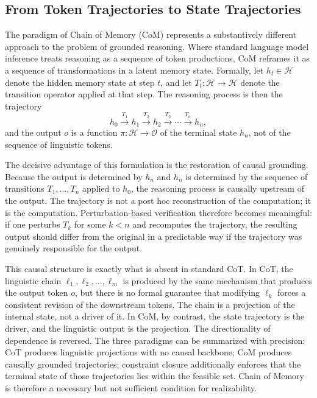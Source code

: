 \documentclass[12pt, oneside]{article}
\begin{document}
\subsection{From Token Trajectories to State Trajectories}

The paradigm of Chain of Memory (CoM) represents a substantively different approach to the problem of grounded reasoning. Where standard language model inference treats reasoning as a sequence of token productions, CoM reframes it as a sequence of transformations in a latent memory state. Formally, let $h_t \in \mathcal{H}$ denote the hidden memory state at step $t$, and let $T_t : \mathcal{H} \to \mathcal{H}$ denote the transition operator applied at that step. The reasoning process is then the trajectory
\begin{equation}
  h_0 \xrightarrow{T_1} h_1 \xrightarrow{T_2} h_2 \xrightarrow{T_3} \cdots \xrightarrow{T_n} h_n,
\end{equation}
and the output $o$ is a function $\pi : \mathcal{H} \to \mathcal{O}$ of the terminal state $h_n$, not of the sequence of linguistic tokens.

The decisive advantage of this formulation is the restoration of causal grounding. Because the output is determined by $h_n$ and $h_n$ is determined by the sequence of transitions $T_1, \ldots, T_n$ applied to $h_0$, the reasoning process is causally upstream of the output. The trajectory is not a post hoc reconstruction of the computation; it is the computation. Perturbation-based verification therefore becomes meaningful: if one perturbs $T_k$ for some $k < n$ and recomputes the trajectory, the resulting output should differ from the original in a predictable way if the trajectory was genuinely responsible for the output.

This causal structure is exactly what is absent in standard CoT. In CoT, the linguistic chain $\ell_1, \ell_2, \ldots, \ell_m$ is produced by the same mechanism that produces the output token $o$, but there is no formal guarantee that modifying $\ell_k$ forces a consistent revision of the downstream tokens. The chain is a projection of the internal state, not a driver of it. In CoM, by contrast, the state trajectory is the driver, and the linguistic output is the projection. The directionality of dependence is reversed. The three paradigms can be summarized with precision: CoT produces linguistic projections with no causal backbone; CoM produces causally grounded trajectories; constraint closure additionally enforces that the terminal state of those trajectories lies within the feasible set. Chain of Memory is therefore a necessary but not sufficient condition for realizability.
\end{document}
